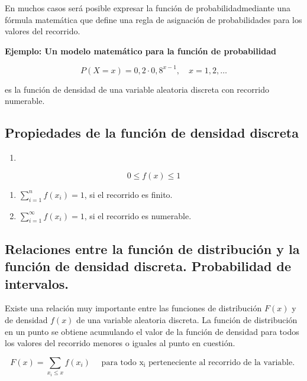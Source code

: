 \documentclass[
  a4paper,
  DIV=11,
  numbers=noendperiod]{scrreprt}
\providecommand{\tightlist}{%
  \setlength{\itemsep}{0pt}\setlength{\parskip}{0pt}}\usepackage{longtable,booktabs,array}
\begin{document}
En muchos casos será posible expresar la función de probabilidadmediante
una fórmula matemática que define una regla de asignación de
probabilidades para los valores del recorrido.

\textbf{Ejemplo: Un modelo matemático para la función de probabilidad}

\[
P(X=x)=0,2 \cdot 0,8^{x-1}, \quad x=1,2, \ldots
\]

es la función de densidad de una variable aleatoria discreta con
recorrido numerable.

\subsection{Propiedades de la función de densidad
discreta}\label{propiedades-de-la-funciuxf3n-de-densidad-discreta}

\begin{enumerate}
\def\labelenumi{\arabic{enumi}.}
\tightlist
\item
\end{enumerate}

\[
0 \leq f(x) \leq 1
\]

\begin{enumerate}
\def\labelenumi{\arabic{enumi}.}
\setcounter{enumi}{1}
\tightlist
\item
  \(\sum_{i=1}^{n} f\left(x_{i}\right)=1\), si el recorrido es finito.
\item
  \(\sum_{i=1}^{\infty} f\left(x_{i}\right)=1\), si el recorrido es
  numerable.
\end{enumerate}

\subsection{\texorpdfstring{Relaciones entre la función de distribución
y la función de densidad discreta. Probabilidad de
intervalos.}{Relaciones entre la función de distribución y la función de densidad discreta.   Probabilidad de intervalos.}}\label{relaciones-entre-la-funciuxf3n-de-distribuciuxf3n-y-la-funciuxf3n-de-densidad-discreta.-probabilidad-de-intervalos.}

Existe una relación muy importante entre las funciones de distribución
\(F(x)\) y de densidad \(f(x)\) de una variable aleatoria discreta. La
función de distribución en un punto se obtiene acumulando el valor de la
función de densidad para todos los valores del recorrido menores o
iguales al punto en cuestión.

\[
F(x)=\sum_{x_{i} \leq x} f\left(x_{i}\right) \quad \text { para todo } \mathrm{x}_{\mathrm{i}} \text { perteneciente al recorrido de la variable. }
\]
\end{document}
